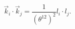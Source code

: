 \begin{equation}
  \vec{k}_i \cdot \vec{k}_j
  = \frac{1}{(\theta^{12})^2} l_i \cdot l_j.
\label{l-and-vector}
\end{equation}


